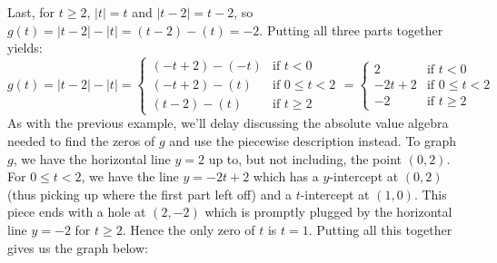 \documentclass{ximera}
\begin{document}
\begin{example}
\begin{enumerate}
\begin{enumerate}
\medskip
	
Last, for $t \geq 2$, $|t| = t$ and $|t - 2| = t - 2$, so $g(t) = |t-2| - |t| = (t - 2) - (t) = -2$.  Putting all three parts together yields: \[ g(t) = |t - 2| - |t| = \begin{cases} 
      (-t + 2) - (-t) &  \text{if $t < 0$} \\
      (-t + 2) - (t)  & \text{if $0 \leq t < 2$} \\
      (t - 2) - (t) &  \text{if $t \geq 2$} 
   \end{cases} = \begin{cases} 
      2 &  \text{if $t < 0$} \\
      -2t + 2  & \text{if $0 \leq t < 2$} \\
      -2 &  \text{if $t \geq 2$} 
   \end{cases}\] As with the previous example, we'll delay discussing the absolute value algebra needed to find the zeros of $g$ and use the piecewise description instead.  To graph $g$, we have the horizontal line $y = 2$ up to, but not including, the point $(0, 2)$.  For $0 \leq t < 2$, we have the line $y = -2t + 2$ which has a $y$-intercept at $(0, 2)$ (thus picking up where the first part left off) and a $t$-intercept at $(1, 0)$. This piece ends with a hole at $(2, -2)$ which is promptly plugged by the horizontal line $y = -2$ for $t \geq 2$.  Hence the only zero of $t$ is $t = 1$.  Putting all this together gives us the graph below:
		

 \begin{image}
\end{image}
\end{enumerate}
\end{enumerate}
\end{example}
\end{document}
